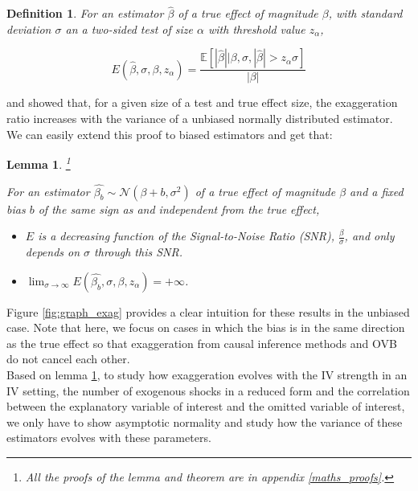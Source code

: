 \documentclass[usletter, 12pt]{article}
\newtheorem{lemma}{Lemma}
\newtheorem{definition}{Definition}
\begin{document}
		 	\begin{definition}\label{def_exagg}
		 		For an estimator $\hat{\beta}$ of a true effect of magnitude $\beta$, with standard deviation $\sigma$ an a two-sided test of size $\alpha$ with threshold value $z_{\alpha}$,
		 
				 \begin{equation}\label{exagg_general}
				 	E(\hat{\beta}, \sigma, \beta, z_{\alpha}) =
					 	\dfrac{\mathbb{E}\left[ | \hat{\beta} | \big| \beta, \sigma, |\hat{\beta}| > z_{\alpha} \sigma \right]}{| \beta |} 
				\end{equation}
			\end{definition}
			
			\cite{lu_note_2019} and \cite{zwet_significance_2021} showed that, for a given size of a test and true effect size, the exaggeration ratio increases with the variance of a unbiased normally distributed estimator. We can easily extend this proof to biased estimators and get that:
			
			\begin{lemma}\footnote{All the proofs of the lemma and theorem are in appendix \ref{maths_proofs}.}\label{lemma_evol_exagg}
			
				For an estimator $\hat{\beta_{b}}  \sim \mathcal{N}(\beta + b, \sigma^{2})$ of a true effect of magnitude $\beta$ and a fixed bias $b$ of the same sign as and independent from the true effect,
				
				\begin{itemize}
					\item $E$ is a decreasing function of the Signal-to-Noise Ratio (SNR), $\frac{\beta}{\sigma}$, and only depends on $\sigma$ through this SNR. 
					\item  $\lim_{\sigma\to \infty} E(\hat{\beta_{b}}, \sigma, \beta, z_{\alpha}) = +\infty$.
				\end{itemize}
			\end{lemma}
			
				Figure \ref{fig:graph_exag} provides a clear intuition for these results in the unbiased case. Note that here, we focus on cases in which the bias is in the same direction as the true effect so that exaggeration from causal inference methods and OVB do not cancel each other.\\
				 
				 Based on lemma \ref{lemma_evol_exagg}, to study how exaggeration evolves with the IV strength in an IV setting, the number of exogenous shocks in a reduced form and the correlation between the explanatory variable of interest and the omitted variable of interest, we only have to show asymptotic normality and study how the variance of these estimators evolves with these parameters.
				 				 
\end{document}
